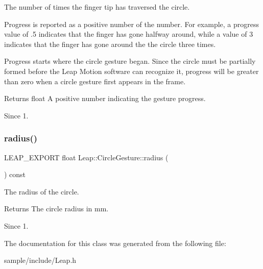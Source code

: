 The number of times the finger tip has traversed the circle.

Progress is reported as a positive number of the number. For example, a progress value of .5 indicates that the finger has gone halfway around, while a value of 3 indicates that the finger has gone around the the circle three times.


\begin{DoxyCodeInclude}
\end{DoxyCodeInclude}


Progress starts where the circle gesture began. Since the circle must be partially formed before the Leap Motion software can recognize it, progress will be greater than zero when a circle gesture first appears in the frame.

\begin{DoxyReturn}{Returns}
float A positive number indicating the gesture progress. 
\end{DoxyReturn}
\begin{DoxySince}{Since}
1. 
\end{DoxySince}
\mbox{\label{class_leap_1_1_circle_gesture_a8d6b58af283d1c58bfed73d149a1dbe3}} 
\subsubsection{\texorpdfstring{radius()}{radius()}}
{\footnotesize\ttfamily L\+E\+A\+P\+\_\+\+E\+X\+P\+O\+RT float Leap\+::\+Circle\+Gesture\+::radius (\begin{DoxyParamCaption}{ }\end{DoxyParamCaption}) const}

The radius of the circle.


\begin{DoxyCodeInclude}
\end{DoxyCodeInclude}


\begin{DoxyReturn}{Returns}
The circle radius in mm. 
\end{DoxyReturn}
\begin{DoxySince}{Since}
1. 
\end{DoxySince}


The documentation for this class was generated from the following file\+:\begin{DoxyCompactItemize}
\item 
sample/include/Leap.\+h\end{DoxyCompactItemize}
